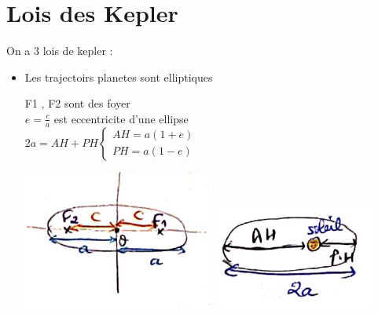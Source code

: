 \documentclass[12pt]{book}
\begin{document}
    \chapter{Lois des Kepler}
        On a 3 lois de kepler :
        \begin{itemize}
            \item Les trajectoirs planetes sont elliptiques \\
                \begin{minipage}{0.79\linewidth}
                    F1 , F2 sont des foyer \\
                    $ e = \frac{c}{a} $ est eccentricite d'une ellipse \\
                    $ 2a = AH + PH \begin{cases}
                        AH =a(1+e)\\
                        PH =a(1-e)
                    \end{cases} $
                \end{minipage}
                \begin{minipage}{0.2\linewidth}
                    \includegraphics[width=\linewidth]{pic/kepler1.png}
                    \includegraphics[width=\linewidth]{pic/kepler2.png}

\end{minipage}
\end{itemize}
\end{document}
